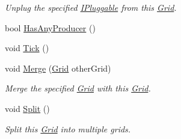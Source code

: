 \begin{DoxyCompactItemize}
\begin{DoxyCompactList}\small\item\em Unplug the specified \hyperlink{interface_project_porcupine_1_1_power_network_1_1_i_pluggable}{I\+Pluggable} from this \hyperlink{class_project_porcupine_1_1_power_network_1_1_grid}{Grid}. \end{DoxyCompactList}\item 
bool \hyperlink{class_project_porcupine_1_1_power_network_1_1_grid_a08ad6cd3b596d237c5b20eb0bcdac963}{Has\+Any\+Producer} ()
\item 
void \hyperlink{class_project_porcupine_1_1_power_network_1_1_grid_ab371c7c2e99eee313277cd560e570418}{Tick} ()
\item 
void \hyperlink{class_project_porcupine_1_1_power_network_1_1_grid_ae148d4d22d825dfe0365788bcba03c6c}{Merge} (\hyperlink{class_project_porcupine_1_1_power_network_1_1_grid}{Grid} other\+Grid)
\begin{DoxyCompactList}\small\item\em Merge the specified \hyperlink{class_project_porcupine_1_1_power_network_1_1_grid}{Grid} with this \hyperlink{class_project_porcupine_1_1_power_network_1_1_grid}{Grid}. \end{DoxyCompactList}\item 
void \hyperlink{class_project_porcupine_1_1_power_network_1_1_grid_ada8e244deb48592263998d6718cf0e69}{Split} ()
\begin{DoxyCompactList}\small\item\em Split this \hyperlink{class_project_porcupine_1_1_power_network_1_1_grid}{Grid} into multiple grids. \end{DoxyCompactList}\end{DoxyCompactItemize}
